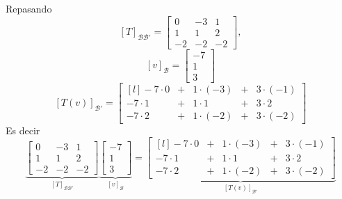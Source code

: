 \documentclass[handout]{beamer} %
\newcommand{\cB}{\mathcal{B}}
\begin{document}
    \begin{frame}
        Repasando \pause
        $$
        [T]_{\cB \cB'} = \begin{bmatrix} 0&-3&1 \\1&1&2\\-2&-2&-2\end{bmatrix},
        $$\pause
        $$
        [v]_{\cB} = \begin{bmatrix}-7 \\1\\3\end{bmatrix}
        $$\pause
        $$
        [T(v)]_{\cB'} =\begin{bmatrix*}[l]
            -7\cdot 0 &+& 1\cdot (-3) &+&3 \cdot (-1) \\
            -7\cdot 1 &+& 1\cdot 1 &+&3 \cdot 2\\ 
            -7\cdot 2 &+& 1\cdot (-2) &+&3 \cdot (-2)
        \end{bmatrix*}
        $$\pause
        Es decir 
        \begin{equation*}
            \underbrace{\begin{bmatrix} 0&-3&1 \\1&1&2\\-2&-2&-2\end{bmatrix}}_{[T]_{\cB \cB' }} 
            \underbrace{\begin{bmatrix}-7 \\1\\3\end{bmatrix}}_{[v]_{\cB}}= 
            \underbrace{
                \begin{bmatrix*}[l]
                    -7\cdot 0 &+& 1\cdot (-3) &+&3 \cdot (-1) \\
                    -7\cdot 1 &+& 1\cdot 1 &+&3 \cdot 2\\ 
                    -7\cdot 2 &+& 1\cdot (-2) &+&3 \cdot (-2)
                \end{bmatrix*}}_{ [T(v)]_{\cB'}}
        \end{equation*}
    \end{frame}
    
    
    
    
\end{document}
